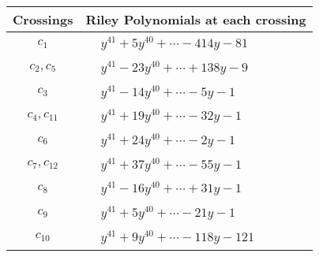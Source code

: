 \documentclass[1p]{elsarticle_modified}
\theoremstyle{definition}
\begin{document}
\begin{tabular}{m{50pt}|m{274pt}}
Crossings & \hspace{64pt}Riley Polynomials at each crossing \\
\hline $$\begin{aligned}c_{1}\end{aligned}$$&$\begin{aligned}
&y^{41}+5 y^{40}+\cdots-414 y-81
\end{aligned}$\\
\hline $$\begin{aligned}c_{2},c_{5}\end{aligned}$$&$\begin{aligned}
&y^{41}-23 y^{40}+\cdots+138 y-9
\end{aligned}$\\
\hline $$\begin{aligned}c_{3}\end{aligned}$$&$\begin{aligned}
&y^{41}-14 y^{40}+\cdots-5 y-1
\end{aligned}$\\
\hline $$\begin{aligned}c_{4},c_{11}\end{aligned}$$&$\begin{aligned}
&y^{41}+19 y^{40}+\cdots-32 y-1
\end{aligned}$\\
\hline $$\begin{aligned}c_{6}\end{aligned}$$&$\begin{aligned}
&y^{41}+24 y^{40}+\cdots-2 y-1
\end{aligned}$\\
\hline $$\begin{aligned}c_{7},c_{12}\end{aligned}$$&$\begin{aligned}
&y^{41}+37 y^{40}+\cdots-55 y-1
\end{aligned}$\\
\hline $$\begin{aligned}c_{8}\end{aligned}$$&$\begin{aligned}
&y^{41}-16 y^{40}+\cdots+31 y-1
\end{aligned}$\\
\hline $$\begin{aligned}c_{9}\end{aligned}$$&$\begin{aligned}
&y^{41}+5 y^{40}+\cdots-21 y-1
\end{aligned}$\\
\hline $$\begin{aligned}c_{10}\end{aligned}$$&$\begin{aligned}
&y^{41}+9 y^{40}+\cdots-118 y-121
\end{aligned}$\\
\hline
\end{tabular}\\~\\
\end{document}
